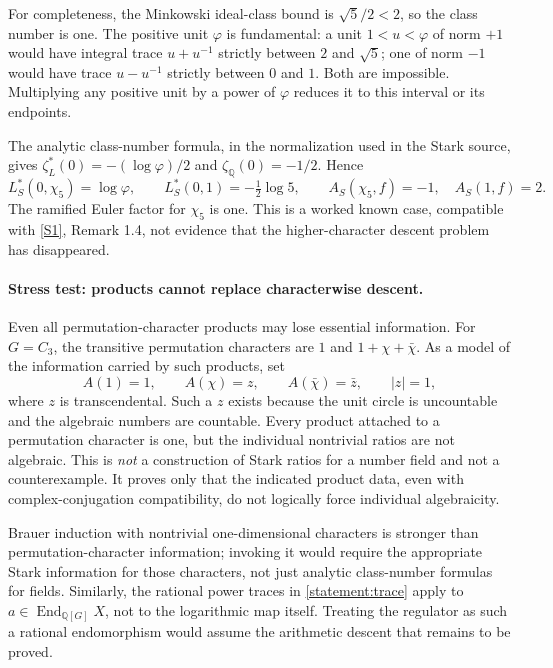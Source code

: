 \documentclass[11pt,a4paper]{article}
\newcommand{\Q}{\mathbb{Q}}
\newcommand{\sref}[2]{\hyperlink{source:#1:#2}{[S#2]}}
\numberwithin{equation}{section}
\begin{document}
For completeness, the Minkowski ideal-class bound is
$\sqrt5/2<2$, so the class number is one. The positive unit
$\varphi$ is fundamental: a unit $1<u<\varphi$ of norm $+1$ would
have integral trace $u+u^{-1}$ strictly between $2$ and $\sqrt5$;
one of norm $-1$ would have trace $u-u^{-1}$ strictly between $0$
and $1$. Both are impossible. Multiplying any positive unit by a
power of $\varphi$ reduces it to this interval or its endpoints.

The analytic class-number formula, in the normalization used in the
Stark source, gives $\zeta_L^*(0)=-(\log\varphi)/2$ and
$\zeta_{\Q}(0)=-1/2$. Hence
\begin{equation}
 L_S^*(0,\chi_5)=\log\varphi,
 \qquad L_S^*(0,1)=-\tfrac12\log5,
 \qquad A_S(\chi_5,f)=-1,\quad A_S(1,f)=2.
\end{equation}
The ramified Euler factor for $\chi_5$ is one. This is a worked known
case, compatible with \sref{statement}{1}, Remark 1.4, not evidence that the
higher-character descent problem has disappeared.

\paragraph{Stress test: products cannot replace characterwise descent.}
Even all permutation-character products may lose essential information.
For $G=C_3$, the transitive permutation characters are $1$ and
$1+\chi+\bar\chi$. As a model of the information carried by such
products, set
\begin{equation}
 A(1)=1,\qquad A(\chi)=z,\qquad A(\bar\chi)=\bar z,
 \qquad |z|=1,
\end{equation}
where $z$ is transcendental. Such a $z$ exists because the unit circle
is uncountable and the algebraic numbers are countable. Every product
attached to a permutation character is one, but the individual
nontrivial ratios are not algebraic. This is \emph{not} a construction
of Stark ratios for a number field and not a counterexample. It proves
only that the indicated product data, even with complex-conjugation
compatibility, do not logically force individual algebraicity.

Brauer induction with nontrivial one-dimensional characters is stronger
than permutation-character information; invoking it would require the
appropriate Stark information for those characters, not just analytic
class-number formulas for fields. Similarly, the rational power traces
in \eqref{statement:trace} apply to $a\in\operatorname{End}_{\Q[G]}X$, not to
the logarithmic map itself. Treating the regulator as such a rational
endomorphism would assume the arithmetic descent that remains to be
proved.
\end{document}
